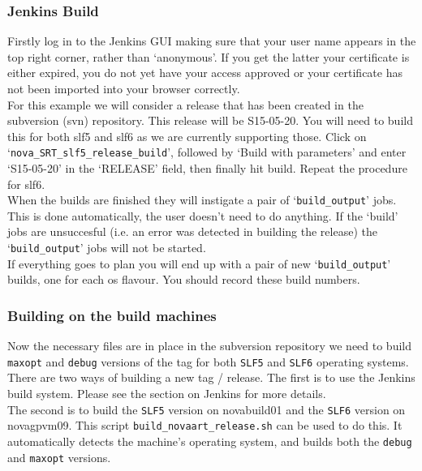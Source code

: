 \documentclass[letterpaper,10pt]{article}
\begin{document}
\subsubsection{Jenkins Build}

Firstly log in to the Jenkins GUI making sure that your user name appears in the top right corner, rather than `anonymous'. If you get the latter your certificate is either expired, you do not yet have your access approved or your certificate has not been imported into your browser correctly.\\

For this example we will consider a release that has been created in the subversion (svn) repository. This release will be S15-05-20. You will need to build this for both slf5 and slf6 as we are currently supporting those. Click on `\verb|nova_SRT_slf5_release_build|', followed by `Build with parameters' and enter `S15-05-20' in the `RELEASE'  field, then finally hit build. Repeat the procedure for slf6.\\

When the builds are finished they will instigate a pair of `\verb|build_output|' jobs. This is done automatically, the user doesn't need to do anything. If the `build' jobs are unsuccesful (i.e. an error was detected in building the release) the `\verb|build_output|' jobs will not be started.\\

If everything goes to plan you will end up with a pair of new `\verb|build_output|' builds, one for each os flavour. You should record these build numbers.


\subsubsection{Building on the build machines}

Now the necessary files are in place in the subversion repository we need to build \verb|maxopt| and \verb|debug| versions of the tag for both \verb|SLF5| and \verb|SLF6| operating systems.\\

\noindent
There are two ways of building a new tag / release. The first is to use the Jenkins build system. Please see the section on Jenkins for more details.\\ %
 
 \noindent
 The second is to build the \verb|SLF5| version on novabuild01 and the \verb|SLF6| version on novagpvm09. This script \verb|build_novaart_release.sh| can be used to do this. It automatically detects the machine's operating system, and builds both the \verb|debug| and \verb|maxopt| versions.\\
 
\end{document}
